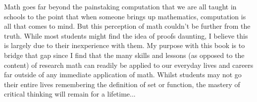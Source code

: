 Math goes far beyond the painstaking computation that we are all taught in schools to the point that when someone brings up mathematics, computation is all that comes to mind.
But this perception of math couldn't be further from the truth.
While most students might find the idea of proofs daunting, I believe this is largely due to their inexperience with them.
My purpose with this book is to bridge that gap since I find that the many skills and lessons (as opposed to the content) of research math can readily be applied to our everyday lives and careers far outside of any immediate application of math.
Whilst students may not go their entire lives remembering the definition of set or function, the mastery of critical thinking will remain for a lifetime...


